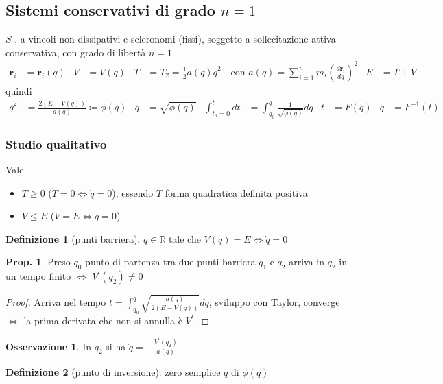 \documentclass[a4paper,10pt]{article}
\theoremstyle{definition}
\newcommand{\bv}{\boldsymbol} %
\newcommand{\re}{\mathbb{R}} %
\theoremstyle{indentdefinition}
\newtheorem{defn}{Definizione}[section]
\theoremstyle{indenttheorem}
\newtheorem{prop}{Prop.}
\theoremstyle{myremark}
\newtheorem*{rem*}{Osservazione}
\theoremstyle{indentgeneral}
\begin{document}
\subsection{Sistemi conservativi di grado $n=1$}

$S$ , a vincoli non dissipativi e scleronomi (fissi),
soggetto a sollecitazione attiva conservativa, con grado di libertà
$n=1$
\begin{align*}
\boldsymbol{r}_{i} & =\boldsymbol{r}_{i}\left(q\right) & V & =V\left(q\right) & T & =T_{2}=\frac{1}{2}a\left(q\right)\dot{q}^{2}\quad\text{con }a\left(q\right)=\sum_{i=1}^{n}m_{i}\left(\frac{d\bv{r}_{i}}{dq}\right)^{2} & E & =T+V
\end{align*}
quindi
\begin{align*}
\dot{q}^{2} & =\frac{2\left(E-V\left(q\right)\right)}{a\left(q\right)}\coloneqq\phi\left(q\right) & \dot{q} & =\sqrt{\phi\left(q\right)} & \int_{t_{0}=0}^{t}dt & =\int_{q_{0}}^{q}\frac{1}{\sqrt{\phi\left(q\right)}}dq & t & =F\left(q\right) & q & =F^{-1}\left(t\right)
\end{align*}


\subsubsection{Studio qualitativo}

Vale 
\begin{itemize}
    \item $T\geq0$ ($T=0\Leftrightarrow\dot{q}=0$), essendo $T$ forma quadratica definita positiva
    \item $V\leq E$ ($V=E\Leftrightarrow\dot{q}=0$)
\end{itemize}

\begin{defn}[punti barriera]
$q\in\re$ tale che $V(q)=E\iff \dot{q}=0$
\end{defn}

\begin{prop}
Preso $q_{0}$ punto di partenza tra due punti barriera $q_{1}$ e
$q_{2}$ arriva in $q_{2}$ in un tempo finito $\Longleftrightarrow$
$V^{\prime}\left(q_{2}\right)\neq0$
\end{prop}

\begin{proof}
Arriva nel tempo $t=\int_{q_{0}}^{q}\sqrt{\frac{a\left(q\right)}{2\left(E-V\left(q\right)\right)}}dq$,
sviluppo con Taylor, converge $\Leftrightarrow$ la prima derivata
che non si annulla è $V^{\prime}$.
\end{proof}
\begin{rem*}
In $q_{2}$ si ha $\ddot{q}=-\frac{V^{\prime}\left(q_{2}\right)}{a\left(q\right)}$
\end{rem*}
\begin{defn}[punto di inversione]
zero semplice $\overline{q}$ di $\phi\left(q\right)$
\end{defn}
\end{document}

